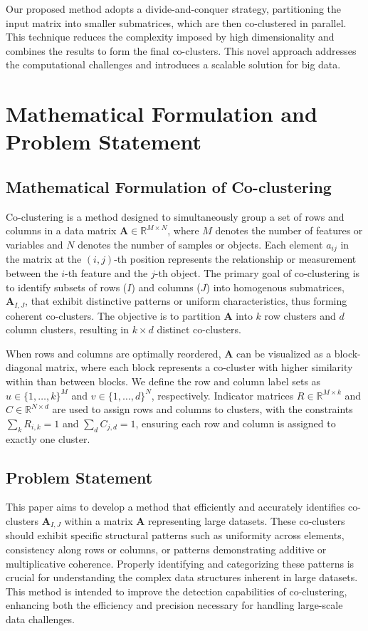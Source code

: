 \documentclass[journal]{IEEEtran}
\begin{document}
Our proposed method adopts a divide-and-conquer strategy, partitioning the input matrix into smaller submatrices, which are then co-clustered in parallel. This technique reduces the complexity imposed by high dimensionality and combines the results to form the final co-clusters. This novel approach addresses the computational challenges and introduces a scalable solution for big data.

\section{Mathematical Formulation and Problem Statement}\label{sec:formula}
\subsection{Mathematical Formulation of Co-clustering}
Co-clustering is a method designed to simultaneously group a set of rows and columns in a data matrix $\mathbf{A} \in \mathbb{R}^{M \times N}$, where $M$ denotes the number of features or variables and $N$ denotes the number of samples or objects. Each element $a_{ij}$ in the matrix at the $(i, j)$-th position represents the relationship or measurement between the $i$-th feature and the $j$-th object. The primary goal of co-clustering is to identify subsets of rows ($I$) and columns ($J$) into homogenous submatrices, $\mathbf{A}_{I, J}$, that exhibit distinctive patterns or uniform characteristics, thus forming coherent co-clusters. The objective is to partition $\mathbf{A}$ into $k$ row clusters and $d$ column clusters, resulting in $k \times d$ distinct co-clusters.

When rows and columns are optimally reordered, $\mathbf{A}$ can be visualized as a block-diagonal matrix, where each block represents a co-cluster with higher similarity within than between blocks. We define the row and column label sets as \( u \in \{1,\dots,k\}^M \) and \( v \in \{1,\dots,d\}^N \), respectively. Indicator matrices \( R \in \mathbb{R}^{M \times k} \) and \( C \in \mathbb{R}^{N \times d} \) are used to assign rows and columns to clusters, with the constraints \( \sum_k R_{i,k} = 1 \) and \( \sum_d C_{j,d} = 1 \), ensuring each row and column is assigned to exactly one cluster.

\subsection{Problem Statement}
This paper aims to develop a method that efficiently and accurately identifies co-clusters $\mathbf{A}_{I, J}$ within a matrix $\mathbf{A}$ representing large datasets. These co-clusters should exhibit specific structural patterns such as uniformity across elements, consistency along rows or columns, or patterns demonstrating additive or multiplicative coherence. Properly identifying and categorizing these patterns is crucial for understanding the complex data structures inherent in large datasets. This method is intended to improve the detection capabilities of co-clustering, enhancing both the efficiency and precision necessary for handling large-scale data challenges.
\end{document}
